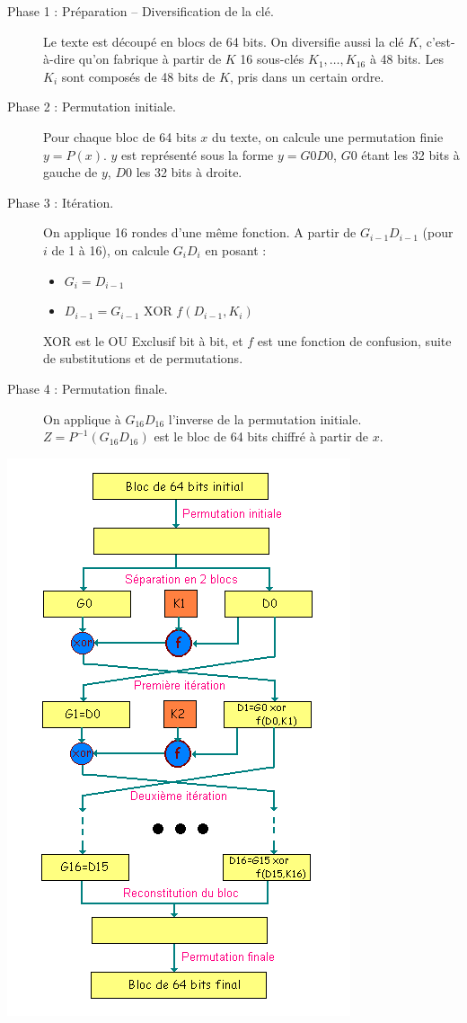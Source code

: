 \documentclass[a4paper,12pt]{article}
\begin{document}
\begin{description}
\item[Phase 1 : Préparation -- Diversification de la clé.] Le texte est décou\-pé en blocs de 64 bits. On diversifie aussi la clé $K$, c'est-à-dire qu'on fabrique à partir de $K$ 16 sous-clés $K_{1}, \dots{}, K_{16}$ à 48 bits. Les $K_{i}$ sont composés de 48 bits de $K$, pris dans un certain ordre.
\item[Phase 2 : Permutation initiale.] Pour chaque bloc de 64 bits $x$ du texte, on calcule une permutation finie $y=P(x)$. $y$ est représenté sous la forme $y=G0D0$, $G0$ étant les 32 bits à gauche de $y$, $D0$ les 32 bits à droite.
\item[Phase 3 : Itération.] On applique 16 rondes d'une même fonction. A partir de $G_{i-1}D_{i-1}$ (pour $i$ de 1 à 16), on calcule $G_{i}D_{i}$ en posant :
  \begin{itemize}
  \item $G_{i} = D_{i-1}$
  \item $D_{i-1} = G_{i-1} \textrm{ XOR } f(D_{i-1},K_{i})$
  \end{itemize}
  XOR est le OU Exclusif bit à bit, et $f$ est une fonction de confusion, suite de substitutions et de permutations.
\item[Phase 4 : Permutation finale.] On applique à $G_{16}D_{16}$ l'inverse de la permutation initiale. $Z = P^{-1}(G_{16}D_{16})$ est le bloc de 64 bits chiffré à partir de $x$.
\end{description}

\begin{center}
  \includegraphics[scale=0.5]{../Image/des.png}
\end{center}
\end{document}
